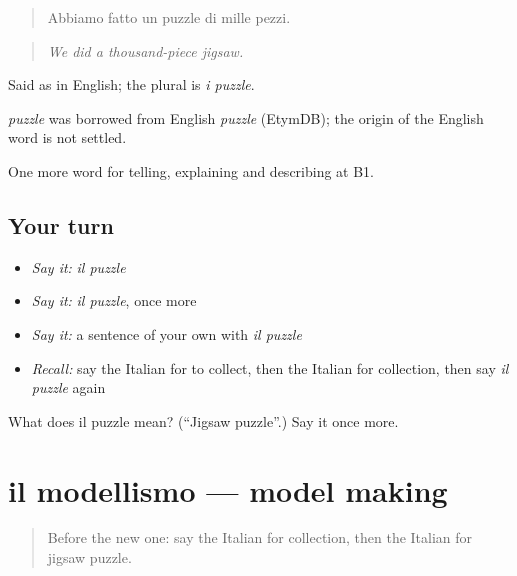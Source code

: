\begin{quote}
Abbiamo fatto un puzzle di mille pezzi.
\end{quote}

\begin{quote}
\emph{We did a thousand-piece jigsaw.}
\end{quote}

Said as in English; the plural is \emph{i puzzle}.

\begin{cousinweb}
\emph{puzzle} was borrowed from English \emph{puzzle} (EtymDB); the origin of the English word is not settled.
\end{cousinweb}

\begin{grammarlens}[title={What you've built}]
One more word for telling, explaining and describing at B1.
\end{grammarlens}

\subsection*{Your turn}
\begin{itemize}
\raggedright
  \item \emph{Say it:} \emph{il puzzle}
  \item \emph{Say it:} \emph{il puzzle}, once more
  \item \emph{Say it:} a sentence of your own with \emph{il puzzle}
  \item \emph{Recall:} say the Italian for to collect, then the Italian for collection, then say \emph{il puzzle} again
\end{itemize}

\begin{tcolorbox}[breakable,colback=teal!4,colframe=teal!35!black,title={Before you move on}]
What does il puzzle mean? (\textquotedblleft{}Jigsaw puzzle\textquotedblright{}.) Say it once more.
\end{tcolorbox}
\section[il modellismo]{il modellismo — model making}

\label{lesson:IT-C505-modellismo}



\begin{quote}
Before the new one: say the Italian for collection, then the Italian for jigsaw puzzle.
\end{quote}


